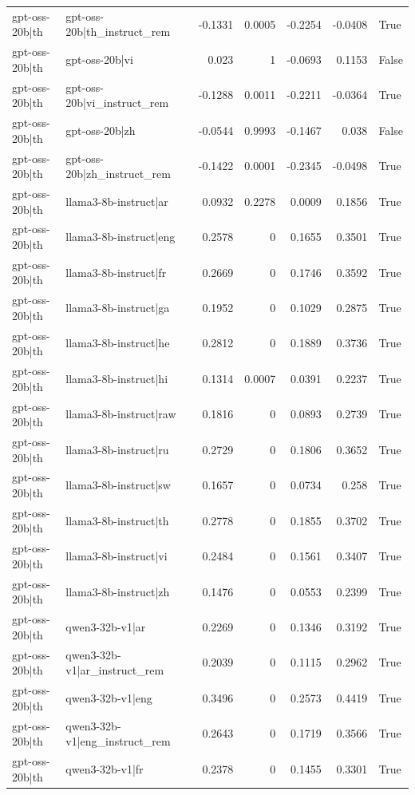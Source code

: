 \begin{table}
\begin{tabular}{l l r r r r l}
gpt-oss-20b|th & gpt-oss-20b|th_instruct_rem & -0.1331 & 0.0005 & -0.2254 & -0.0408 & True \\
gpt-oss-20b|th & gpt-oss-20b|vi & 0.023 & 1 & -0.0693 & 0.1153 & False \\
gpt-oss-20b|th & gpt-oss-20b|vi_instruct_rem & -0.1288 & 0.0011 & -0.2211 & -0.0364 & True \\
gpt-oss-20b|th & gpt-oss-20b|zh & -0.0544 & 0.9993 & -0.1467 & 0.038 & False \\
gpt-oss-20b|th & gpt-oss-20b|zh_instruct_rem & -0.1422 & 0.0001 & -0.2345 & -0.0498 & True \\
gpt-oss-20b|th & llama3-8b-instruct|ar & 0.0932 & 0.2278 & 0.0009 & 0.1856 & True \\
gpt-oss-20b|th & llama3-8b-instruct|eng & 0.2578 & 0 & 0.1655 & 0.3501 & True \\
gpt-oss-20b|th & llama3-8b-instruct|fr & 0.2669 & 0 & 0.1746 & 0.3592 & True \\
gpt-oss-20b|th & llama3-8b-instruct|ga & 0.1952 & 0 & 0.1029 & 0.2875 & True \\
gpt-oss-20b|th & llama3-8b-instruct|he & 0.2812 & 0 & 0.1889 & 0.3736 & True \\
gpt-oss-20b|th & llama3-8b-instruct|hi & 0.1314 & 0.0007 & 0.0391 & 0.2237 & True \\
gpt-oss-20b|th & llama3-8b-instruct|raw & 0.1816 & 0 & 0.0893 & 0.2739 & True \\
gpt-oss-20b|th & llama3-8b-instruct|ru & 0.2729 & 0 & 0.1806 & 0.3652 & True \\
gpt-oss-20b|th & llama3-8b-instruct|sw & 0.1657 & 0 & 0.0734 & 0.258 & True \\
gpt-oss-20b|th & llama3-8b-instruct|th & 0.2778 & 0 & 0.1855 & 0.3702 & True \\
gpt-oss-20b|th & llama3-8b-instruct|vi & 0.2484 & 0 & 0.1561 & 0.3407 & True \\
gpt-oss-20b|th & llama3-8b-instruct|zh & 0.1476 & 0 & 0.0553 & 0.2399 & True \\
gpt-oss-20b|th & qwen3-32b-v1|ar & 0.2269 & 0 & 0.1346 & 0.3192 & True \\
gpt-oss-20b|th & qwen3-32b-v1|ar_instruct_rem & 0.2039 & 0 & 0.1115 & 0.2962 & True \\
gpt-oss-20b|th & qwen3-32b-v1|eng & 0.3496 & 0 & 0.2573 & 0.4419 & True \\
gpt-oss-20b|th & qwen3-32b-v1|eng_instruct_rem & 0.2643 & 0 & 0.1719 & 0.3566 & True \\
gpt-oss-20b|th & qwen3-32b-v1|fr & 0.2378 & 0 & 0.1455 & 0.3301 & True \\

\end{tabular}
\end{table}
